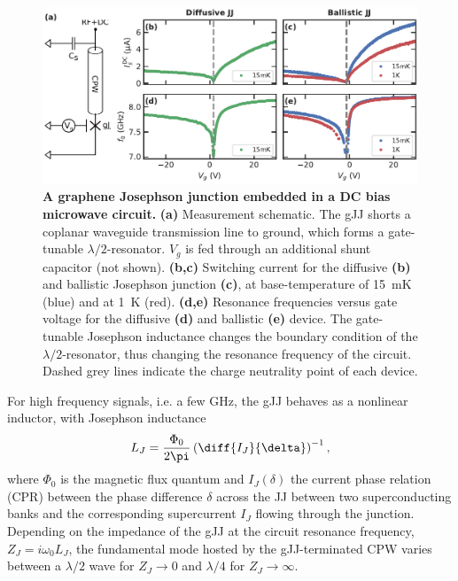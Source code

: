\begin{figure}[t]
	\centering
	\includegraphics[width=\linewidth]{chapter-gJJ-CPR/figs/Figure1}
	\caption{
		\textbf{A graphene Josephson junction embedded in a DC bias microwave circuit.}
		\textbf{(a)} Measurement schematic.
		The gJJ shorts a coplanar waveguide transmission line to ground, which forms a gate-tunable $\lambda/2$-resonator.
		$V_g$ is fed through an additional shunt capacitor (not shown).
		\textbf{(b,c)} Switching current for the diffusive \textbf{(b)} and ballistic Josephson junction \textbf{(c)}, at base-temperature of \SI{15}{\milli\kelvin} (blue) and at \SI{1}{\kelvin} (red).
		\textbf{(d,e)} Resonance frequencies versus gate voltage for the diffusive \textbf{(d)} and ballistic \textbf{(e)} device.
		The gate-tunable Josephson inductance changes the boundary condition of the $\lambda/2$-resonator, thus changing the resonance frequency of the circuit.
		Dashed grey lines indicate the charge neutrality point of each device.
	}
	\label{fig:figure1}
\end{figure}

For high frequency signals, i.e. a few \si{\giga\hertz}, the gJJ behaves as a nonlinear inductor, with Josephson inductance
%
\begin{align}
L_J = \frac{\Phi_0}{2\pi}\left(\diff{I_J}{\delta}\right)^{-1},
\label{eq:LJgeneral}
\end{align}
%
where $\Phi_0$ is the magnetic flux quantum and $I_J(\delta)$ the current phase relation (CPR) between the phase difference $\delta$ across the JJ between two superconducting banks and the corresponding supercurrent $I_J$ flowing through the junction.
%
Depending on the impedance of the gJJ at the circuit resonance frequency, $Z_J=i\omega_0 L_J$, the fundamental mode hosted by the gJJ-terminated CPW varies between a $\lambda/2$ wave for $Z_J\rightarrow0$ and $\lambda/4$ for $Z_J\rightarrow\infty$.

